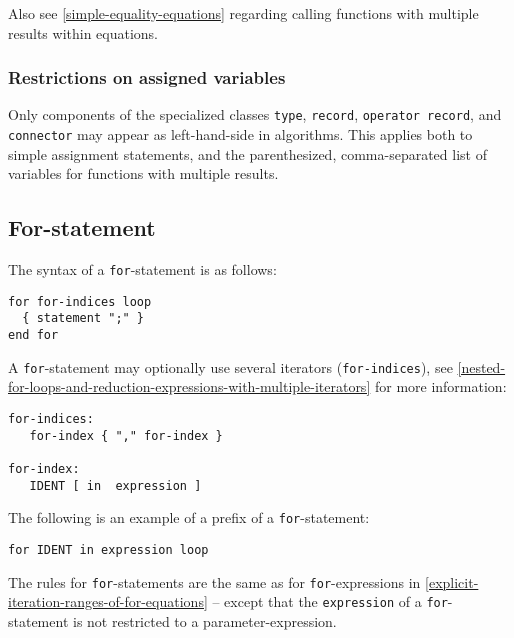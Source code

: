 \begin{nonnormative}
Also see \cref{simple-equality-equations} regarding calling functions with
multiple results within equations.
\end{nonnormative}

\subsubsection{Restrictions on assigned variables}\label{restrictions-on-assigned-variables}

Only components of the specialized classes \lstinline!type!, \lstinline!record!, \lstinline!operator record!, and \lstinline!connector! may appear as left-hand-side in algorithms.
This applies both to simple assignment statements, and the parenthesized, comma-separated list of variables for functions with multiple results.

\subsection{For-statement}\label{for-statement}

The syntax of a \lstinline!for!-statement is as follows:
\begin{lstlisting}[language=grammar]
for for-indices loop
  { statement ";" }
end for
\end{lstlisting}
A \lstinline!for!-statement may optionally use several iterators (\lstinline!for-indices!), see \cref{nested-for-loops-and-reduction-expressions-with-multiple-iterators} for more information:
\begin{lstlisting}[language=grammar]
for-indices:
   for-index { "," for-index }

for-index:
   IDENT [ in  expression ]
\end{lstlisting}
The following is an example of a prefix of a \lstinline!for!-statement:
\begin{lstlisting}[language=modelica]
for IDENT in expression loop
\end{lstlisting}
The rules for \lstinline!for!-statements are the same as for \lstinline!for!-expressions in \cref{explicit-iteration-ranges-of-for-equations} -- except that the \lstinline!expression! of a \lstinline!for!-statement is not restricted to a parameter-expression.

